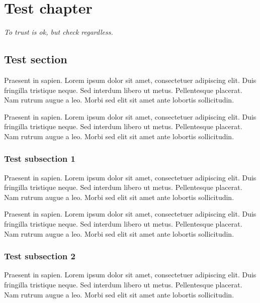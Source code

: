 

\chapter*{Test chapter}

\begin{flushright}
\parbox{0.6\textwidth}{
\emph{To trust is ok, but check regardless.\newline
{} } }
\end{flushright}

\section*{Test section}

Praesent in sapien. Lorem ipsum dolor sit amet, consectetuer adipiscing elit.
Duis fringilla tristique neque. Sed interdum libero ut metus. Pellentesque placerat.
Nam rutrum augue a leo. Morbi sed elit sit amet ante lobortis sollicitudin.

Praesent in sapien. Lorem ipsum dolor sit amet, consectetuer adipiscing elit.
Duis fringilla tristique neque. Sed interdum libero ut metus. Pellentesque placerat.
Nam rutrum augue a leo. Morbi sed elit sit amet ante lobortis sollicitudin.

\subsection*{Test subsection 1}
Praesent in sapien. Lorem ipsum dolor sit amet, consectetuer adipiscing elit.
Duis fringilla tristique neque. Sed interdum libero ut metus. Pellentesque placerat.
Nam rutrum augue a leo. Morbi sed elit sit amet ante lobortis sollicitudin.

Praesent in sapien. Lorem ipsum dolor sit amet, consectetuer adipiscing elit.
Duis fringilla tristique neque. Sed interdum libero ut metus. Pellentesque placerat.
Nam rutrum augue a leo. Morbi sed elit sit amet ante lobortis sollicitudin.

\subsection*{Test subsection 2}
Praesent in sapien. Lorem ipsum dolor sit amet, consectetuer adipiscing elit.
Duis fringilla tristique neque. Sed interdum libero ut metus. Pellentesque placerat.
Nam rutrum augue a leo. Morbi sed elit sit amet ante lobortis sollicitudin.


